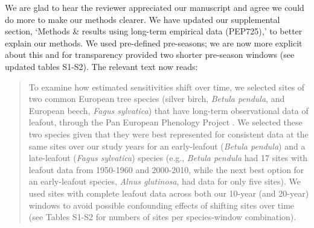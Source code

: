 \documentclass[11pt]{article}
\begin{document}
We are glad to hear the reviewer appreciated our manuscript and agree we could do more to make our methods clearer. We have updated our supplemental section, `Methods \& results using long-term empirical data (PEP725),' to better explain our methods. We used pre-defined pre-seasons; we are now more explicit about this and for transparency provided two shorter pre-season windows (see updated tables S1-S2). The relevant text now reads:
\begin{quote}
To examine how estimated sensitivities shift over time, we selected sites of two common European tree species (silver birch, \emph{Betula pendula}, and European beech, \emph{Fagus sylvatica}) that have long-term observational data of leafout, through the Pan European Phenology Project \citep[PEP725,][]{Templ2018}. We selected these two species given that they were best represented for consistent data at the same sites over our study years for an early-leafout (\emph{Betula pendula}) and a late-leafout (\emph{Fagus sylvatica}) species (e.g., \emph{Betula pendula} had 17 sites with leafout data from 1950-1960 and 2000-2010, while the next best option for an early-leafout species, \emph{Alnus glutinosa}, had data for only five sites). We used sites with complete leafout data across both our 10-year (and 20-year) windows to avoid possible confounding effects of shifting sites over time (see Tables S1-S2 for numbers of sites per species-window combination). \\


\end{quote}
\end{document}
